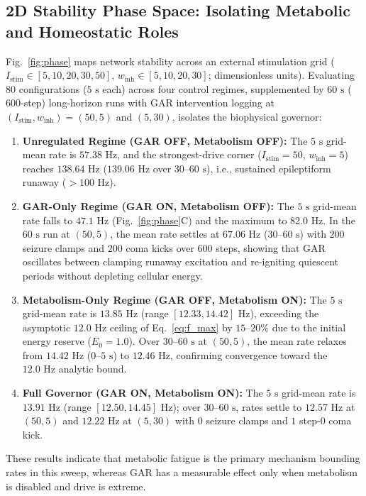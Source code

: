 \documentclass[journal]{IEEEtran}
\begin{document}
\subsection{2D Stability Phase Space: Isolating Metabolic and Homeostatic Roles}
Fig.~\ref{fig:phase} maps network stability across an external stimulation grid ($I_{\mathrm{stim}} \in [5, 10, 20, 30, 50]$, $w_{\mathrm{inh}} \in [5, 10, 20, 30]$; dimensionless units). Evaluating $80$ configurations ($5\text{ s}$ each) across four control regimes, supplemented by $60\text{ s}$ ($600$-step) long-horizon runs with GAR intervention logging at $(I_{\mathrm{stim}}, w_{\mathrm{inh}}) = (50, 5)$ and $(5, 30)$, isolates the biophysical governor:
\begin{enumerate}
    \item \textbf{Unregulated Regime (GAR OFF, Metabolism OFF):} The $5\text{ s}$ grid-mean rate is $57.38\text{ Hz}$, and the strongest-drive corner ($I_{\mathrm{stim}} = 50$, $w_{\mathrm{inh}} = 5$) reaches $138.64\text{ Hz}$ ($139.06\text{ Hz}$ over $30\text{--}60\text{ s}$), i.e., sustained epileptiform runaway ($>100\text{ Hz}$).
    \item \textbf{GAR-Only Regime (GAR ON, Metabolism OFF):} The $5\text{ s}$ grid-mean rate falls to $47.1\text{ Hz}$ (Fig.~\ref{fig:phase}C) and the maximum to $82.0\text{ Hz}$. In the $60\text{ s}$ run at $(50, 5)$, the mean rate settles at $67.06\text{ Hz}$ ($30\text{--}60\text{ s}$) with $200$ seizure clamps and $200$ coma kicks over $600$ steps, showing that GAR oscillates between clamping runaway excitation and re-igniting quiescent periods without depleting cellular energy.
    \item \textbf{Metabolism-Only Regime (GAR OFF, Metabolism ON):} The $5\text{ s}$ grid-mean rate is $13.85\text{ Hz}$ (range $[12.33, 14.42]\text{ Hz}$), exceeding the asymptotic $12.0\text{ Hz}$ ceiling of Eq.~\eqref{eq:f_max} by $15\text{--}20\%$ due to the initial energy reserve ($E_0 = 1.0$). Over $30\text{--}60\text{ s}$ at $(50, 5)$, the mean rate relaxes from $14.42\text{ Hz}$ ($0\text{--}5\text{ s}$) to $12.46\text{ Hz}$, confirming convergence toward the $12.0\text{ Hz}$ analytic bound.
    \item \textbf{Full Governor (GAR ON, Metabolism ON):} The $5\text{ s}$ grid-mean rate is $13.91\text{ Hz}$ (range $[12.50, 14.45]\text{ Hz}$); over $30\text{--}60\text{ s}$, rates settle to $12.57\text{ Hz}$ at $(50, 5)$ and $12.22\text{ Hz}$ at $(5, 30)$ with $0$ seizure clamps and $1$ step-0 coma kick.
\end{enumerate}
These results indicate that metabolic fatigue is the primary mechanism bounding rates in this sweep, whereas GAR has a measurable effect only when metabolism is disabled and drive is extreme.
\end{document}
